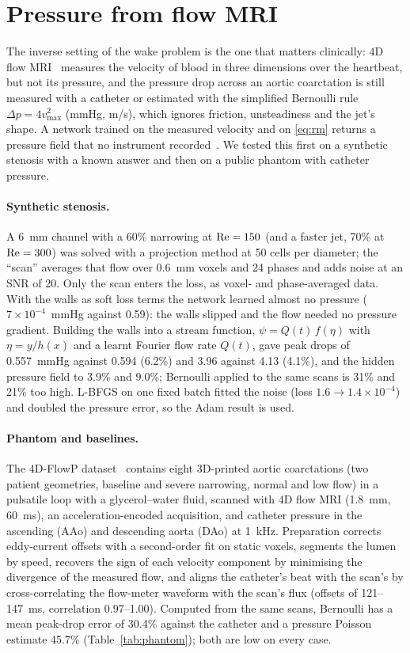 \section{Pressure from flow MRI}
\label{sec:mri}
The inverse setting of the wake problem is the one that matters clinically: 4D flow MRI~\cite{markl2012} measures
the velocity of blood in three dimensions over the heartbeat, but not its pressure, and the pressure drop across an
aortic coarctation is still measured with a catheter or estimated with the simplified Bernoulli rule
$\Delta p=4v_{\max}^2$ (mmHg, m/s), which ignores friction, unsteadiness and the jet's shape. A network trained on the
measured velocity and on \eqref{eq:rm} returns a pressure field that no instrument recorded~\cite{kissas2020}. We
tested this first on a synthetic stenosis with a known answer and then on a public phantom with catheter pressure.

\paragraph{Synthetic stenosis.} A 6~mm channel with a 60\% narrowing at $\mathrm{Re}=150$ (and a faster jet, 70\% at
$\mathrm{Re}=300$) was solved with a projection method at 50 cells per diameter; the ``scan'' averages that flow over
0.6~mm voxels and 24 phases and adds noise at an SNR of 20. Only the scan enters the loss, as voxel- and
phase-averaged data. With the walls as soft loss terms the network learned almost no pressure ($7\times10^{-4}$~mmHg
against 0.59): the walls slipped and the flow needed no pressure gradient. Building the walls into a stream function,
$\psi=Q(t)\,f(\eta)$ with $\eta=y/h(x)$ and a learnt Fourier flow rate $Q(t)$, gave peak drops of 0.557~mmHg against
0.594 (6.2\%) and 3.96 against 4.13 (4.1\%), and the hidden pressure field to 3.9\% and 9.0\%; Bernoulli applied to
the same scans is 31\% and 21\% too high. L-BFGS on one fixed batch fitted the noise (loss $1.6\to1.4\times10^{-4}$)
and doubled the pressure error, so the Adam result is used.

\paragraph{Phantom and baselines.} The 4D-FlowP dataset~\cite{nair4dflowp} contains eight 3D-printed aortic
coarctations (two patient geometries, baseline and severe narrowing, normal and low flow) in a pulsatile loop with a
glycerol--water fluid, scanned with 4D flow MRI (1.8~mm, 60~ms), an acceleration-encoded acquisition, and catheter
pressure in the ascending (AAo) and descending aorta (DAo) at 1~kHz. Preparation corrects eddy-current offsets with a
second-order fit on static voxels, segments the lumen by speed, recovers the sign of each velocity component by
minimising the divergence of the measured flow, and aligns the catheter's beat with the scan's by cross-correlating
the flow-meter waveform with the scan's flux (offsets of 121--147~ms, correlation 0.97--1.00). Computed from the same
scans, Bernoulli has a mean peak-drop error of 30.4\% against the catheter and a pressure Poisson
estimate 45.7\% (Table~\ref{tab:phantom}); both are low on every case.

